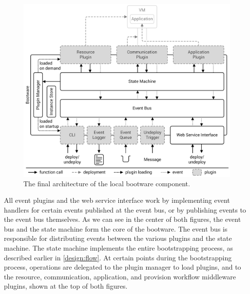 \begin{figure}[!htbp]
	\centering
	\includegraphics[resolution=600]{design/assets/final_architecture_local}
	\caption{The final architecture of the local bootware component.}
	\label{image:finalarchlocal}
\end{figure}

All event plugins and the web service interface work by implementing event handlers for certain events published at the event bus, or by publishing events to the event bus themselves.
As we can see in the center of both figures, the event bus and the state machine form the core of the bootware.
The event bus is responsible for distributing events between the various plugins and the state machine.
The state machine implements the entire bootstrapping process, as described earlier in \autoref{design:flow}.
At certain points during the bootstrapping process, operations are delegated to the plugin manager to load plugins, and to the resource, communication, application, and provision workflow middleware plugins, shown at the top of both figures.


